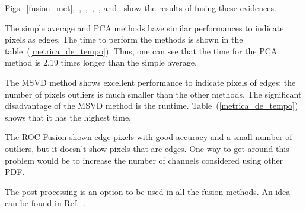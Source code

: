 \documentclass[journal]{IEEEtran}
\begin{document}
Figs.~\ref{fusion_met},~,~,~,~, and~ show the results of fusing these evidences. 

The simple average and PCA methods have similar performances to indicate pixels as edges. The time to perform the methods is shown in the table~(\ref{metrica_de_tempo}). Thus, one can see that the time for the PCA method is 2.19 times longer than the simple average.  

The MSVD method shows excellent performance to indicate pixels of edges; the number of pixels outliers is much smaller than the other methods. The significant disadvantage of the MSVD method is the runtime. Table~(\ref{metrica_de_tempo}) shows that it has the highest time.

The ROC Fusion shown edge pixels with good accuracy and a small number of outliers, but it doesn't show pixels that are edges. One way to get around this problem would be to increase the number of channels considered using other PDF.

The post-processing is an option to be used in all the fusion methods. An idea can be found in Ref.~\cite{gmbf}. 
\end{document}
